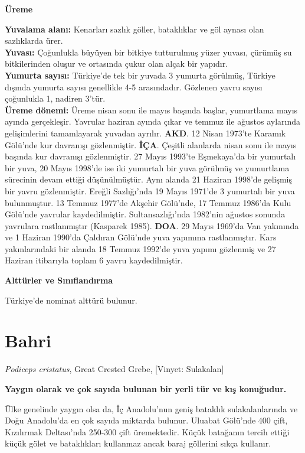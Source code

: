 \documentclass[
  letterpaper,
  DIV=11,
  numbers=noendperiod]{scrreprt}
\begin{document}
\textbf{Üreme}

\textbf{Yuvalama alanı:} Kenarları sazlık göller, bataklıklar ve göl
aynası olan sazlıklarda ürer.\\
\textbf{Yuvası:} Çoğunlukla büyüyen bir bitkiye tutturulmuş yüzer
yuvası, çürümüş su bitkilerinden oluşur ve ortasında çukur olan alçak
bir yapıdır.\\
\textbf{Yumurta sayısı:} Türkiye'de tek bir yuvada 3 yumurta görülmüş,
Türkiye dışında yumurta sayısı genellikle 4-5 arasındadır. Gözlenen
yavru sayısı çoğunlukla 1, nadiren 3'tür.\\
\textbf{Üreme dönemi:} Üreme nisan sonu ile mayıs başında başlar,
yumurtlama mayıs ayında gerçekleşir. Yavrular haziran ayında çıkar ve
temmuz ile ağustos aylarında gelişimlerini tamamlayarak yuvadan ayrılır.
\textbf{AKD}. 12 Nisan 1973'te Karamık Gölü'nde kur davranışı
gözlenmiştir. \textbf{İÇA}. Çeşitli alanlarda nisan sonu ile mayıs
başında kur davranışı gözlenmiştir. 27 Mayıs 1993'te Eşmekaya'da bir
yumurtalı bir yuva, 20 Mayıs 1998'de ise iki yumurtalı bir yuva görülmüş
ve yumurtlama sürecinin devam ettiği düşünülmüştür. Aynı alanda 21
Haziran 1998'de gelişmiş bir yavru gözlenmiştir. Ereğli Sazlığı'nda 19
Mayıs 1971'de 3 yumurtalı bir yuva bulunmuştur. 13 Temmuz 1977'de
Akşehir Gölü'nde, 17 Temmuz 1986'da Kulu Gölü'nde yavrular
kaydedilmiştir. Sultansazlığı'nda 1982'nin ağustos sonunda yavrulara
rastlanmıştır (Kasparek 1985). \textbf{DOA}. 29 Mayıs 1969'da Van
yakınında ve 1 Haziran 1990'da Çaldıran Gölü'nde yuva yapımına
rastlanmıştır. Kars yakınlarındaki bir alanda 18 Temmuz 1992'de yuva
yapımı gözlenmiş ve 27 Haziran itibarıyla toplam 6 yavru kaydedilmiştir.

\textbf{Alttürler ve Sınıflandırma}

Türkiye'de nominat alttürü bulunur.

\section{Bahri}\label{bahri}

\emph{Podiceps cristatus}, Great Crested Grebe, {[}Vinyet: Sulakalan{]}

\textbf{Yaygın olarak ve çok sayıda bulunan bir yerli tür ve kış
konuğudur.}

Ülke genelinde yaygın olsa da, İç Anadolu'nun geniş bataklık
sulakalanlarında ve Doğu Anadolu'da en çok sayıda miktarda bulunur.
Uluabat Gölü'nde 400 çift, Kızılırmak Deltası'nda 250-300 çift
üremektedir. Küçük batağanın tercih ettiği küçük gölet ve bataklıkları
kullanmaz ancak baraj göllerini sıkça kullanır.
\end{document}

